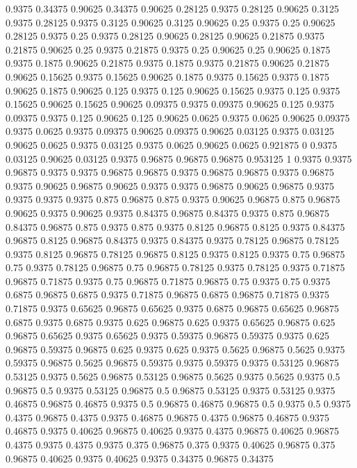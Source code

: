 0.9375 0.34375
0.90625 0.34375
0.90625 0.28125
0.9375 0.28125
0.90625 0.3125
0.9375 0.28125
0.9375 0.3125
0.90625 0.3125
0.90625 0.25
0.9375 0.25
0.90625 0.28125
0.9375 0.25
0.9375 0.28125
0.90625 0.28125
0.90625 0.21875
0.9375 0.21875
0.90625 0.25
0.9375 0.21875
0.9375 0.25
0.90625 0.25
0.90625 0.1875
0.9375 0.1875
0.90625 0.21875
0.9375 0.1875
0.9375 0.21875
0.90625 0.21875
0.90625 0.15625
0.9375 0.15625
0.90625 0.1875
0.9375 0.15625
0.9375 0.1875
0.90625 0.1875
0.90625 0.125
0.9375 0.125
0.90625 0.15625
0.9375 0.125
0.9375 0.15625
0.90625 0.15625
0.90625 0.09375
0.9375 0.09375
0.90625 0.125
0.9375 0.09375
0.9375 0.125
0.90625 0.125
0.90625 0.0625
0.9375 0.0625
0.90625 0.09375
0.9375 0.0625
0.9375 0.09375
0.90625 0.09375
0.90625 0.03125
0.9375 0.03125
0.90625 0.0625
0.9375 0.03125
0.9375 0.0625
0.90625 0.0625
0.921875 0
0.9375 0.03125
0.90625 0.03125
0.9375 0.96875
0.96875 0.96875
0.953125 1
0.9375 0.9375
0.96875 0.9375
0.9375 0.96875
0.96875 0.9375
0.96875 0.96875
0.9375 0.96875
0.9375 0.90625
0.96875 0.90625
0.9375 0.9375
0.96875 0.90625
0.96875 0.9375
0.9375 0.9375
0.9375 0.875
0.96875 0.875
0.9375 0.90625
0.96875 0.875
0.96875 0.90625
0.9375 0.90625
0.9375 0.84375
0.96875 0.84375
0.9375 0.875
0.96875 0.84375
0.96875 0.875
0.9375 0.875
0.9375 0.8125
0.96875 0.8125
0.9375 0.84375
0.96875 0.8125
0.96875 0.84375
0.9375 0.84375
0.9375 0.78125
0.96875 0.78125
0.9375 0.8125
0.96875 0.78125
0.96875 0.8125
0.9375 0.8125
0.9375 0.75
0.96875 0.75
0.9375 0.78125
0.96875 0.75
0.96875 0.78125
0.9375 0.78125
0.9375 0.71875
0.96875 0.71875
0.9375 0.75
0.96875 0.71875
0.96875 0.75
0.9375 0.75
0.9375 0.6875
0.96875 0.6875
0.9375 0.71875
0.96875 0.6875
0.96875 0.71875
0.9375 0.71875
0.9375 0.65625
0.96875 0.65625
0.9375 0.6875
0.96875 0.65625
0.96875 0.6875
0.9375 0.6875
0.9375 0.625
0.96875 0.625
0.9375 0.65625
0.96875 0.625
0.96875 0.65625
0.9375 0.65625
0.9375 0.59375
0.96875 0.59375
0.9375 0.625
0.96875 0.59375
0.96875 0.625
0.9375 0.625
0.9375 0.5625
0.96875 0.5625
0.9375 0.59375
0.96875 0.5625
0.96875 0.59375
0.9375 0.59375
0.9375 0.53125
0.96875 0.53125
0.9375 0.5625
0.96875 0.53125
0.96875 0.5625
0.9375 0.5625
0.9375 0.5
0.96875 0.5
0.9375 0.53125
0.96875 0.5
0.96875 0.53125
0.9375 0.53125
0.9375 0.46875
0.96875 0.46875
0.9375 0.5
0.96875 0.46875
0.96875 0.5
0.9375 0.5
0.9375 0.4375
0.96875 0.4375
0.9375 0.46875
0.96875 0.4375
0.96875 0.46875
0.9375 0.46875
0.9375 0.40625
0.96875 0.40625
0.9375 0.4375
0.96875 0.40625
0.96875 0.4375
0.9375 0.4375
0.9375 0.375
0.96875 0.375
0.9375 0.40625
0.96875 0.375
0.96875 0.40625
0.9375 0.40625
0.9375 0.34375
0.96875 0.34375

